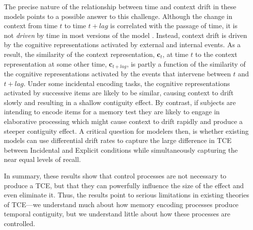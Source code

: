 \documentclass[jou,natbib,floatsintext]{apa6} %
\begin{document}
The precise nature of the relationship between time and context drift in these models points to a possible answer to this challenge. Although the change in context from time $t$ to time $t+lag$ is correlated with the passage of time, it is not \emph{driven} by time in most versions of the model \citep[but see][for a model in which drift is driven by time]{HowaEtal14a}. Instead, context drift is driven by the cognitive representations activated by external and internal events. As a result, the similarity of the context representation, $\mathbf{c}_t$, at time $t$ to the context representation at some other time, $\mathbf{c}_{t+lag}$, is partly a function of the similarity of the cognitive representations activated by the events that intervene between $t$ and $t+lag$. Under some incidental encoding tasks, the cognitive representations activated by successive items are likely to be similar, causing context to drift slowly and resulting in a shallow contiguity effect. By contrast, if subjects are intending to encode items for a memory test they are likely to engage in elaborative processing which might cause context to drift rapidly and produce a steeper contiguity effect. A critical question for modelers then, is whether existing models can use differential drift rates to capture the large difference in TCE between Incidental and Explicit conditions while simultaneously capturing the near equal levels of recall.

In summary, these results show that control processes are not necessary to produce a TCE, but that they can powerfully influence the size of the effect and even eliminate it. Thus, the results point to serious limitations in existing theories of TCE---we understand much about how memory encoding processes produce temporal contiguity, but we understand little about how these processes are controlled.


\end{document}
